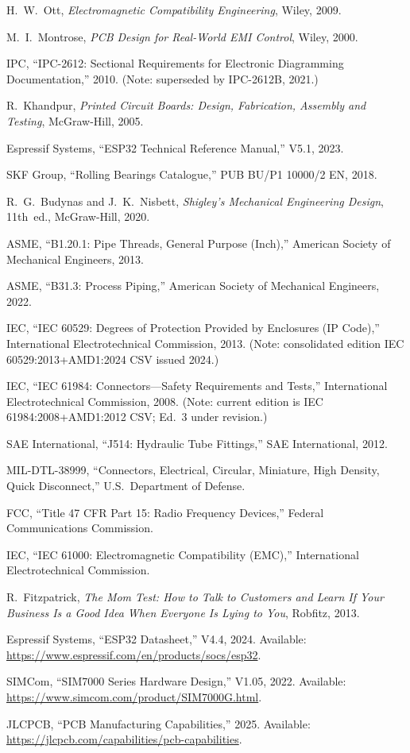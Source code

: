 \begin{enumerate}[label={[\arabic*]},leftmargin=2em]
\item H.~W.~Ott, \emph{Electromagnetic Compatibility Engineering}, Wiley, 2009.
\item M.~I.~Montrose, \emph{PCB Design for Real-World EMI Control}, Wiley, 2000.
\item IPC, ``IPC-2612: Sectional Requirements for Electronic Diagramming Documentation,'' 2010. (Note: superseded by IPC-2612B, 2021.) \label{ipc2612}
\item R.~Khandpur, \emph{Printed Circuit Boards: Design, Fabrication, Assembly and Testing}, McGraw-Hill, 2005.
\item Espressif Systems, ``ESP32 Technical Reference Manual,'' V5.1, 2023.
\item SKF Group, ``Rolling Bearings Catalogue,'' PUB BU/P1 10000/2 EN, 2018.
\item R.~G.~Budynas and J.~K.~Nisbett, \emph{Shigley's Mechanical Engineering Design}, 11th~ed., McGraw-Hill, 2020.
\item ASME, ``B1.20.1: Pipe Threads, General Purpose (Inch),'' American Society of Mechanical Engineers, 2013.
\item ASME, ``B31.3: Process Piping,'' American Society of Mechanical Engineers, 2022.
\item IEC, ``IEC 60529: Degrees of Protection Provided by Enclosures (IP Code),'' International Electrotechnical Commission, 2013. (Note: consolidated edition IEC 60529:2013+AMD1:2024 CSV issued 2024.)
\item IEC, ``IEC 61984: Connectors---Safety Requirements and Tests,'' International Electrotechnical Commission, 2008. (Note: current edition is IEC 61984:2008+AMD1:2012 CSV; Ed.~3 under revision.)
\item SAE International, ``J514: Hydraulic Tube Fittings,'' SAE International, 2012.
\item MIL-DTL-38999, ``Connectors, Electrical, Circular, Miniature, High Density, Quick Disconnect,'' U.S.\ Department of Defense.
\item FCC, ``Title 47 CFR Part 15: Radio Frequency Devices,'' Federal Communications Commission.
\item IEC, ``IEC 61000: Electromagnetic Compatibility (EMC),'' International Electrotechnical Commission.
\item R.~Fitzpatrick, \emph{The Mom Test: How to Talk to Customers and Learn If Your Business Is a Good Idea When Everyone Is Lying to You}, Robfitz, 2013.
\item Espressif Systems, ``ESP32 Datasheet,'' V4.4, 2024. Available: \url{https://www.espressif.com/en/products/socs/esp32}.
\item SIMCom, ``SIM7000 Series Hardware Design,'' V1.05, 2022. Available: \url{https://www.simcom.com/product/SIM7000G.html}.
\item JLCPCB, ``PCB Manufacturing Capabilities,'' 2025. Available: \url{https://jlcpcb.com/capabilities/pcb-capabilities}.
\end{enumerate}
